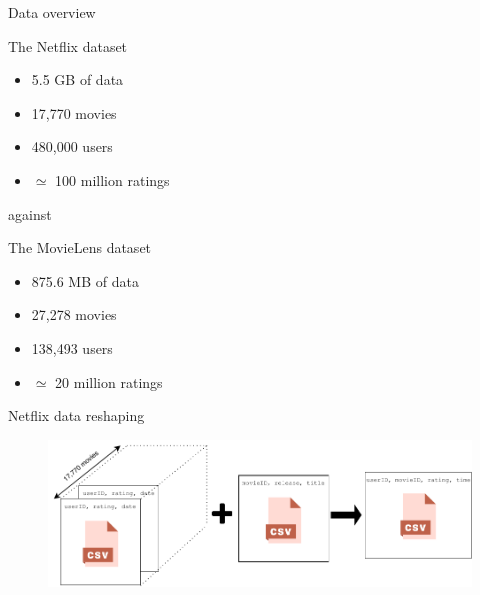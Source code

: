 \begin{frame}{Data overview}
		
\begin{center}
	\begin{minipage}{6cm}
		
	\begin{block}{The Netflix dataset}
	\begin{itemize}
		\item 5.5 GB of data
		\item 17,770 movies
		\item 480,000 users
		\item $\simeq$ 100 million ratings

	\end{itemize}
\end{block}
	\end{minipage}


\vspace{0.5cm}
against

\begin{minipage}{6cm}
	\begin{block}{The MovieLens dataset}

	\begin{itemize}
		\item 875.6 MB of data
		\item 27,278 movies
		\item 138,493 users
		\item $\simeq$ 20 million ratings
	\end{itemize}
\end{block}
\end{minipage}
\end{center}
\end{frame}


\begin{frame}{Netflix data reshaping}
	
\begin{figure}[h]
	\centering
	\includegraphics[width=\linewidth]{processing.pdf}
\end{figure}
\end{frame}

